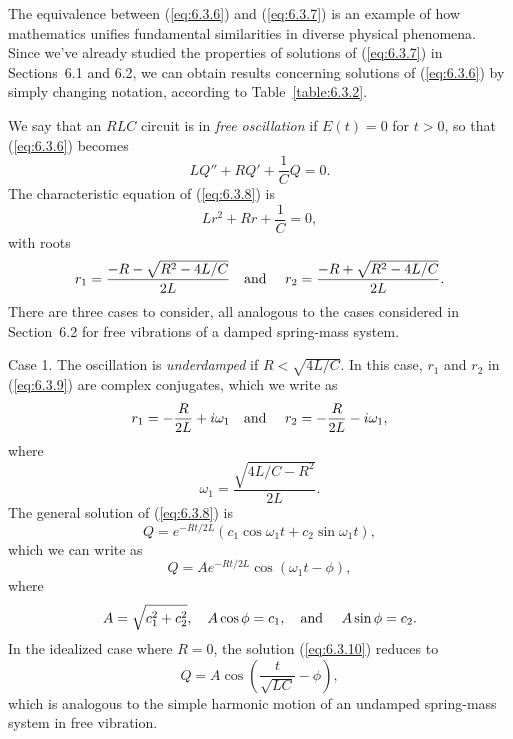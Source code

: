 
\medskip
The equivalence between (\ref{eq:6.3.6}) and (\ref{eq:6.3.7}) is an example of how mathematics
unifies fundamental similarities in diverse physical phenomena. Since we've already studied the
properties of solutions of (\ref{eq:6.3.7}) in Sections~6.1 and 6.2, we can obtain results
concerning solutions of (\ref{eq:6.3.6}) by simply changing notation, according to
Table~\ref{table:6.3.2}.


\noindent
We say that an $RLC$ circuit is in {\color{blue}\it free oscillation\/} if $E(t)=0$ for $t>0$, so
that (\ref{eq:6.3.6}) becomes
\begin{equation}
  \label{eq:6.3.8}LQ''+RQ'+\frac{1}{C}Q=0.
\end{equation}
The characteristic equation of (\ref{eq:6.3.8}) is
\[
  Lr^{2}+Rr+\frac{1}{C}=0,
\]
with roots
\begin{equation}
  \label{eq:6.3.9}r_{1}=\frac{-R-\sqrt{R^{2}-4L/C}}{2L}\mbox{\quad and \quad}r_{2}= \frac{-R+\sqrt{R^{2}-4L/C}}{2L}.
\end{equation}
There are three cases to consider, all analogous to the cases considered in Section~6.2 for free
vibrations of a damped spring-mass system.

{\sc Case 1.} The oscillation is {\color{blue}\it underdamped\/} if $R<\sqrt{4L/C}$. In this case,
$r_{1}$ and $r_{2}$ in (\ref{eq:6.3.9}) are complex conjugates, which we write as
\[
  r_{1}=-\frac{R}{2L}+i\omega_{1}\mbox{\quad and \quad}r_{2}=-\frac{R}{2L}-i\omega_{1},
\]
where
\[
  \omega_{1}=\frac{\sqrt{4L/C-R^{2}}}{2L}.
\]
The general solution of (\ref{eq:6.3.8}) is
\[
  Q=e^{-Rt/2L}(c_{1}\cos\omega_{1}t+c_{2}\sin\omega_{1}t),
\]
which we can write as
\begin{equation}
  \label{eq:6.3.10}Q=Ae^{-Rt/2L}\cos(\omega_{1}t-\phi),
\end{equation}
where
\[
  A=\sqrt{c_{1}^{2}+c_{2}^{2}},\quad A\cos\phi=c_{1},\mbox{\quad and \quad}A\sin\phi=c_{2}.
\]
In the idealized case where $R=0$, the solution (\ref{eq:6.3.10}) reduces to
\[
  Q=A\cos\left(\frac{t}{\sqrt{LC}}-\phi\right),
\]
which is analogous to the simple harmonic motion of an undamped spring-mass system in free
vibration.

